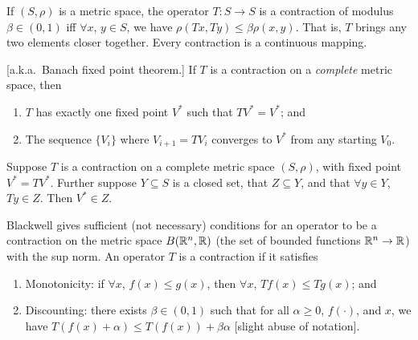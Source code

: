 \documentclass[8pt,letterpaper, landscape]{extarticle} %
\begin{document}
\begin{multicols}{3}
\begin{description}
 If $ (S, \rho) $ is a metric space, the operator $ T \colon S \to S $ is a contraction of modulus $ \beta \in (0,1) $ iff $ \forall x $, $ y \in S $, we have $ \rho (Tx, Ty) \leq \beta \rho (x,y) $. That is, $ T $ brings any two elements closer together. Every contraction is a continuous mapping.

 [a.k.a.\ Banach fixed point theorem.] If $ T $ is a contraction on a \textit{complete} metric space, then
\begin{enumerate}
\item $ T $ has exactly one fixed point $ V^* $ such that $ TV^* = V^* $; and
\item The sequence $ \{ V_i \} $ where $ V_{i+1} = TV_i $ converges to $ V^* $ from any starting $ V_0 $.
\end{enumerate}

 Suppose $ T $ is a contraction on a complete metric space $ (S, \rho) $, with fixed point $ V^* = TV^* $. Further suppose $ Y \subseteq S $ is a closed set, that $ Z \subseteq Y $, and that $ \forall y \in Y $, $ Ty \in Z $. Then $ V^* \in Z $.

 Blackwell gives sufficient (not necessary) conditions for an operator to be a contraction on the metric space $ B(\mathbb{R}^n , \mathbb{R}) $ (the set of bounded functions $ \mathbb{R}^n \to \mathbb{R} $) with the sup norm. An operator $ T $ is a contraction if it satisfies
\begin{enumerate}
\item Monotonicity: if $ \forall x $, $ f(x) \leq g(x) $, then $ \forall x $, $ Tf(x) \leq Tg(x) $; and
\item Discounting: there exists $ \beta \in (0,1) $ such that for all $ \alpha \geq 0 $, $ f (\cdot) $, and $ x $, we have $ T(f(x) + \alpha) \leq T(f(x)) + \beta \alpha $ [slight abuse of notation].
\end{enumerate}


\end{description}
\end{multicols}
\end{document}
